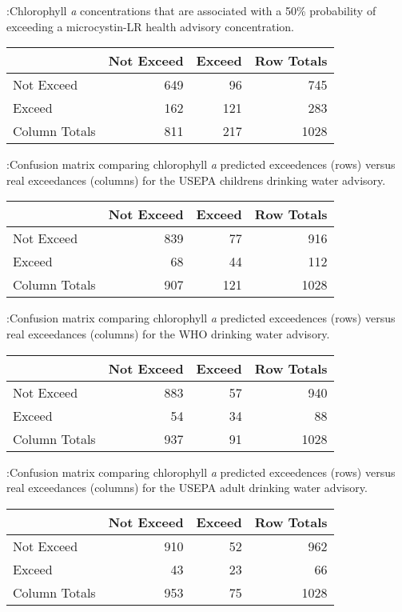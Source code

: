 \documentclass[10pt,a4paper,twocolumn]{article}
\begin{document}
:Chlorophyll \textit{a} concentrations that are associated with a 50\%
probability of exceeding a microcystin-LR health advisory concentration.
\label{tab:mc_chla_table}

\newpage

\begin{tabular}{l|r|r|r}
\hline
  & Not Exceed & Exceed & Row Totals\\
\hline
Not Exceed & 649 & 96 & 745\\
\hline
Exceed & 162 & 121 & 283\\
\hline
Column Totals & 811 & 217 & 1028\\
\hline
\end{tabular}

:Confusion matrix comparing chlorophyll \textit{a} predicted exceedences
(rows) versus real exceedances (columns) for the USEPA childrens
drinking water advisory. \label{tab:child_conmat_table}

\newpage

\begin{tabular}{l|r|r|r}
\hline
  & Not Exceed & Exceed & Row Totals\\
\hline
Not Exceed & 839 & 77 & 916\\
\hline
Exceed & 68 & 44 & 112\\
\hline
Column Totals & 907 & 121 & 1028\\
\hline
\end{tabular}

:Confusion matrix comparing chlorophyll \textit{a} predicted exceedences
(rows) versus real exceedances (columns) for the WHO drinking water
advisory. \label{tab:who_drink_conmat_table}

\newpage

\begin{tabular}{l|r|r|r}
\hline
  & Not Exceed & Exceed & Row Totals\\
\hline
Not Exceed & 883 & 57 & 940\\
\hline
Exceed & 54 & 34 & 88\\
\hline
Column Totals & 937 & 91 & 1028\\
\hline
\end{tabular}

:Confusion matrix comparing chlorophyll \textit{a} predicted exceedences
(rows) versus real exceedances (columns) for the USEPA adult drinking
water advisory. \label{tab:adult_conmat_table}

\newpage

\begin{tabular}{l|r|r|r}
\hline
  & Not Exceed & Exceed & Row Totals\\
\hline
Not Exceed & 910 & 52 & 962\\
\hline
Exceed & 43 & 23 & 66\\
\hline
Column Totals & 953 & 75 & 1028\\
\hline
\end{tabular}
\end{document}
